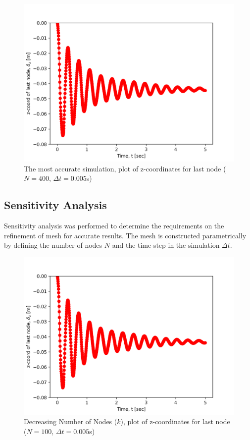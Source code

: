 \documentclass[letterpaper, 10 pt, conference]{ieeeconf}  %
\begin{document}
\begin{figure}[h!]
   \centering
   \includegraphics[width=0.8\linewidth]{../figures/n_400_dt_0-005_z_plot.png}
   \caption{The most accurate simulation, plot of z-coordinates for last node ($N=400$, $\Delta t = 0.005$s)}
   \label{fig:accurate_zplot}
\end{figure}

\subsection{Sensitivity Analysis}

Sensitivity analysis was performed to determine the requirements on the refinement of mesh for accurate results.
The mesh is constructed parametrically by defining the number of nodes $N$ and the time-step in the simulation $\Delta t$.

\begin{figure}[h!]
   \centering
   \includegraphics[width=0.8\linewidth]{../figures/n_100_dt_0-005_z_plot.png}
   \caption{Decreasing Number of Nodes ($k$), plot of z-coordinates for last node ($N=100$, $\Delta t = 0.005$s)}
   \label{fig:lessNodes_zplot}
\end{figure}
\end{document}
